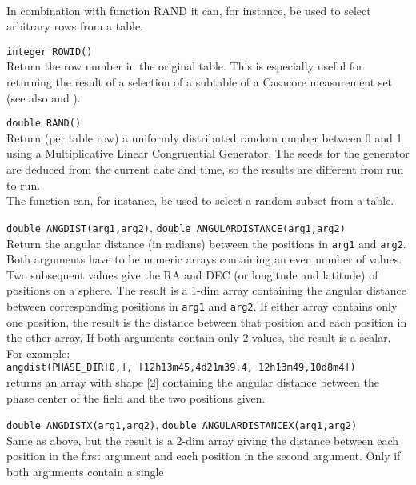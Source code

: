 \begin{description}
    \\In combination with function RAND it can, for instance,
    be used to select arbitrary rows from a table.
  \item[] \texttt{integer ROWID()}\\
    Return the row number in the original table. This is especially
    useful for returning the result of a selection of a subtable
    of a Casacore measurement set
    (see also 
    and ).
  \item[] \texttt{double RAND()}\\
    Return (per table row) a uniformly distributed random number
    between 0 and 1 using a Multiplicative Linear Congruential Generator.
    The seeds for the generator are deduced from the current date and
    time, so the results are different from run to run.
    \\The function can, for instance, be used to select a random
    subset from a table.
  \item[] \texttt{double ANGDIST(arg1,arg2)},
              \texttt{double ANGULARDISTANCE(arg1,arg2)}\\
    Return the angular distance (in radians) between the
    positions in \texttt{arg1} and \texttt{arg2}. Both arguments have
    to be numeric arrays containing an even number of values. Two subsequent values 
    give the RA and DEC (or longitude and latitude) of positions on a
    sphere. The result is a 1-dim array containing the angular
    distance between corresponding positions in \texttt{arg1} and
    \texttt{arg2}.
    If either array contains only one position, the result is the
    distance between that position and each position in the other array.
    If both arguments contain only 2 values, the result is a scalar.
    For example:
    \\\texttt{angdist(PHASE\_DIR[0,], [12h13m45,4d21m39.4, 12h13m49,10d8m4])}
    \\returns an array with shape [2] containing the angular
    distance between the phase center of the field and the two positions given. 
  \item[] \texttt{double ANGDISTX(arg1,arg2)},
              \texttt{double ANGULARDISTANCEX(arg1,arg2)}\\
    Same as above, but the result is a 2-dim array giving the distance
    between each position in the first argument and each position in
    the second argument. Only if both arguments contain a single

\end{description}
